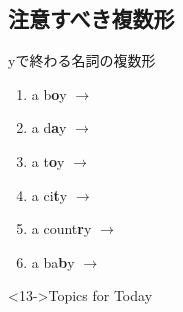 \documentclass[aspectratio=169,xcolor={dvipsnames,table}]{beamer}
\newcommand{\myaudio}[1]{\href{#1}{\faVolumeUp}}
\begin{document}
\subsection{注意すべき複数形}
\begin{frame}[plain]{yで終わる名詞の複数形}\Large
\begin{enumerate}
 \item<1-> a b\textbf<14->{\textcolor<14->{YellowOrange}{o}}y $\rightarrow$ 
 \item<3-> a d\textbf<14->{\textcolor<14->{YellowOrange}{a}}y $\rightarrow$ 
 \item<5-> a t\textbf<14->{\textcolor<14->{YellowOrange}{o}}y $\rightarrow$ 
 \item<7-> a ci\textbf<14->{\textcolor<14->{CarnationPink}{t}}y $\rightarrow$ 
 \item<9-> a count\textbf<14->{\textcolor<14->{CarnationPink}{r}}y $\rightarrow$ 
 \item<11-> a ba\textbf<14->{\textcolor<14->{CarnationPink}{b}}y $\rightarrow$ 
\end{enumerate} 

\normalsize
\begin{exampleblock}<13->{Topics for Today}
\\
\myaudio{./audio/005_singular_plural_b.mp3}\hfill{}
\end{exampleblock}

\end{frame}
\end{document}
